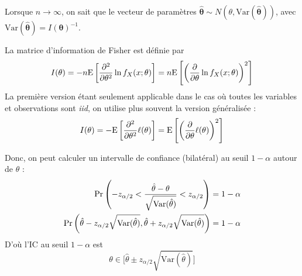 \documentclass[12pt, french]{report}
\begin{document}
Lorsque $n \to \infty$, on sait que le vecteur de paramètres $\bm{\hat{\theta}} \sim N(\theta, \mathrm{Var}(\bm{\hat{\theta}}))$, avec $\mathrm{Var}(\bm{\hat{\theta}}) = I(\bm{\theta})^{-1}$.

\begin{definition}
La matrice d'information de Fisher est définie par
\begin{equation}
I(\theta) = -n \mathrm{E} \left[ \frac{\partial^2}{\partial \theta^2} \ln f_X(x ; \theta) \right] = n \mathrm{E} \left[ \left( \frac{\partial}{\partial \theta} \ln f_X(x ; \theta) \right)^2 \right]
\end{equation}
La première version étant seulement applicable dans le cas où toutes les variables et observations sont \emph{iid}, on utilise plus souvent la version généralisée : 
\begin{equation}
I(\theta) = -\mathrm{E} \left[ \frac{\partial^2}{\partial \theta^2} \ell(\theta) \right] = \mathrm{E} \left[ \left( \frac{\partial}{\partial \theta} \ell(\theta) \right)^2 \right]
\end{equation}
\end{definition}

Donc, on peut calculer un intervalle de confiance (bilatéral) au seuil $1-\alpha$ autour de $\theta$ : 
\begin{align*}
\Pr \left( -z_{\alpha/2} < \frac{\hat{\theta} - \theta}{\sqrt{\mathrm{Var}(\hat{\theta})}}  < z_{ \alpha/2}  \right) & = 1 - \alpha \\
\Pr \left( \hat{\theta} - z_{\alpha/2} \sqrt{\mathrm{Var}(\hat{\theta})}, \hat{\theta} + z_{\alpha/2} \sqrt{\mathrm{Var}(\hat{\theta})} \right) & = 1 - \alpha \\
\end{align*}
D'où l'IC au seuil $1 - \alpha$ est
\begin{equation}
\theta \in \Big [   \hat{\theta} \pm z_{\alpha/2} \sqrt{\mathrm{Var}(\hat{\theta})} \Big ]
\end{equation}
\end{document}
